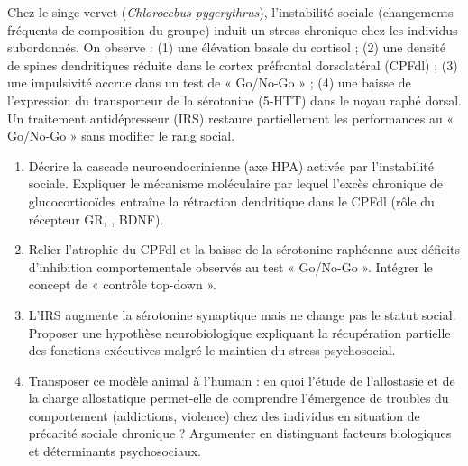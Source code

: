 \documentclass[11pt]{article}
\begin{document}
\begin{exercice}
Chez le singe vervet (\textit{Chlorocebus pygerythrus}), l'instabilité sociale (changements fréquents de composition du groupe) induit un stress chronique chez les individus subordonnés. On observe : (1) une élévation basale du cortisol ; (2) une densité de spines dendritiques réduite dans le cortex préfrontal dorsolatéral (CPFdl) ; (3) une impulsivité accrue dans un test de « Go/No-Go » ; (4) une baisse de l'expression du transporteur de la sérotonine (5-HTT) dans le noyau raphé dorsal. Un traitement antidépresseur (IRS) restaure partiellement les performances au « Go/No-Go » sans modifier le rang social.
\begin{enumerate}
    \item Décrire la cascade neuroendocrinienne (axe HPA) activée par l'instabilité sociale. Expliquer le mécanisme moléculaire par lequel l'excès chronique de glucocorticoïdes entraîne la rétraction dendritique dans le CPFdl (rôle du récepteur GR, , BDNF).
    \item Relier l'atrophie du CPFdl et la baisse de la sérotonine raphéenne aux déficits d'inhibition comportementale observés au test « Go/No-Go ». Intégrer le concept de « contrôle top-down ».
    \item L'IRS augmente la sérotonine synaptique mais ne change pas le statut social. Proposer une hypothèse neurobiologique expliquant la récupération partielle des fonctions exécutives malgré le maintien du stress psychosocial.
    \item Transposer ce modèle animal à l'humain : en quoi l'étude de l'allostasie et de la charge allostatique permet-elle de comprendre l'émergence de troubles du comportement (addictions, violence) chez des individus en situation de précarité sociale chronique ? Argumenter en distinguant facteurs biologiques et déterminants psychosociaux.
\end{enumerate}
\end{exercice}
\end{document}
